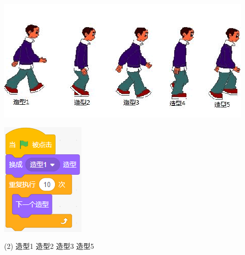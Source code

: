 \documentclass[10pt, a4paper]{article}
\begin{document}
\begin{enumerate}
        \begin{minipage}{.35\textwidth}
            \centering
            \includegraphics[width=\textwidth]{figure/3-1.png}
        \end{minipage}
        \begin{minipage}{.15\textwidth}
            \centering
            \includegraphics[width=.7\textwidth]{figure/3-2.png}
        \end{minipage}
        \begin{minipage}{.4\textwidth}
            \centering
            \begin{tasks}(2)
                \task 造型1
                \task 造型2
                \task 造型3
                \task 造型5
            \end{tasks}
        \end{minipage}


\end{enumerate}
\end{document}
